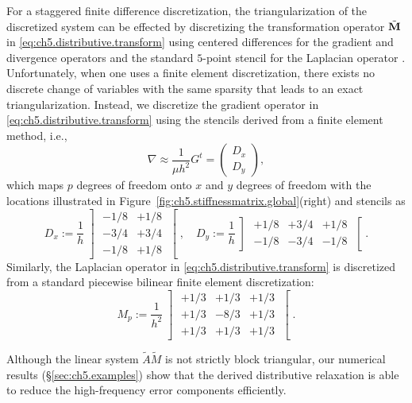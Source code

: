 For a staggered finite difference discretization, the triangularization of the discretized system can be effected by discretizing the transformation operator $\tilde{\mathbf{M}}$ in \eqref{eq:ch5.distributive.transform} using centered
differences for the gradient and divergence operators and the standard $5$-point stencil for the Laplacian operator \cite{Zhu.Yongning10}. Unfortunately, when one uses a finite element discretization, there exists no discrete change of variables with the same sparsity that leads to an exact triangularization. Instead, we discretize the gradient operator in
\eqref{eq:ch5.distributive.transform} using the stencils derived from a finite element method, i.e.,
\begin{equation*}
\nabla \approx \frac{1}{\mu h^2} G^t = \begin{pmatrix} D_x \\ D_y \end{pmatrix},
\end{equation*}
which maps $p$ degrees of freedom onto $x$ and $y$ degrees of freedom with the locations illustrated in Figure~\ref{fig:ch5.stiffnessmatrix.global}(right) and stencils as
\begin{equation*}
D_x := \frac{1}{h}
\left] \begin{matrix} -1/8 & +1/8 \\ -3/4 & +3/4 \\ -1/8 & +1/8 \end{matrix} \right[, \quad
D_y := \frac{1}{h}
\left] \begin{matrix} +1/8 & +3/4 & +1/8 \\ -1/8 & -3/4 & -1/8 \end{matrix} \right[.
\end{equation*}
Similarly, the Laplacian operator in \eqref{eq:ch5.distributive.transform} is discretized from a standard piecewise bilinear finite element discretization:
\begin{equation*}
M_p := \frac{1}{h^2} \left] \begin{matrix} +1/3 & +1/3 & +1/3 \\ +1/3 & -8/3 & +1/3 \\ +1/3 & +1/3 & +1/3 \end{matrix} \right[.
\end{equation*}

Although the linear system $\tilde{A} \tilde{M}$ is not strictly block triangular, our numerical results (\S\ref{sec:ch5.examples}) show that the derived distributive relaxation is able to reduce the high-frequency error components efficiently.

